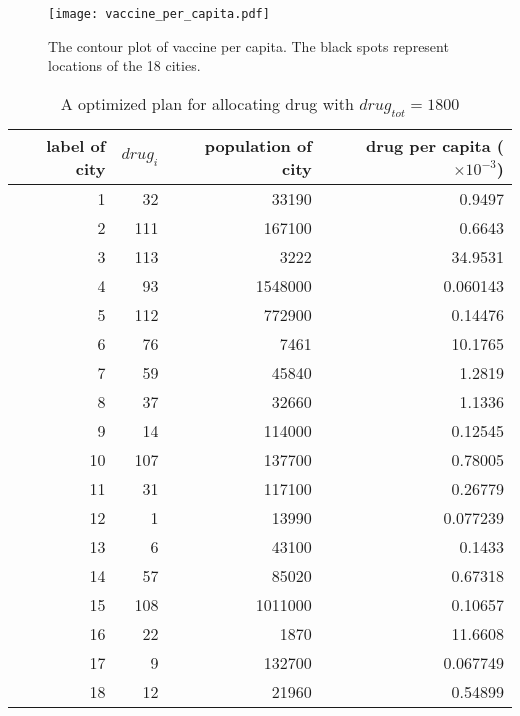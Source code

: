 \begin{figure}
	\centering
	\texttt{[image: vaccine\_per\_capita.pdf]}
	\caption{The contour plot of vaccine per capita. The black spots represent locations of the 18 cities.}
	\label{vaccine_per_capita.pdf}
\end{figure}

\begin{table}[]
	\centering
	\begin{tabular}{|r|r|r|r|}
		\hline
		label of city & $drug_i$ & population of city & drug per capita ($\times 10^{-3}$) \\ \hline
		1             & 32       & 33190              & 0.9497                             \\ \hline
		2             & 111      & 167100             & 0.6643                             \\ \hline
		3             & 113      & 3222               & 34.9531                            \\ \hline
		4             & 93       & 1548000            & 0.060143                           \\ \hline
		5             & 112      & 772900             & 0.14476                            \\ \hline
		6             & 76       & 7461               & 10.1765                            \\ \hline
		7             & 59       & 45840              & 1.2819                             \\ \hline
		8             & 37       & 32660              & 1.1336                             \\ \hline
		9             & 14       & 114000             & 0.12545                            \\ \hline
		10            & 107      & 137700             & 0.78005                            \\ \hline
		11            & 31       & 117100             & 0.26779                            \\ \hline
		12            & 1        & 13990              & 0.077239                           \\ \hline
		13            & 6        & 43100              & 0.1433                             \\ \hline
		14            & 57       & 85020              & 0.67318                            \\ \hline
		15            & 108      & 1011000            & 0.10657                            \\ \hline
		16            & 22       & 1870               & 11.6608                            \\ \hline
		17            & 9        & 132700             & 0.067749                           \\ \hline
		18            & 12       & 21960              & 0.54899                            \\ \hline
	\end{tabular}
	\caption{A optimized plan for allocating drug with $drug_{tot} = 1800$ }
	\label{drug}
\end{table}
